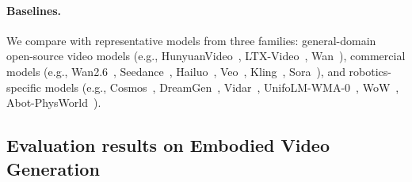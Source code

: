 \documentclass{llmxive}
\begin{document}
\paragraph{Baselines.} We compare with representative models from three families:
general-domain open-source video models (e.g., HunyuanVideo~\cite{wu2025hunyuanvideo}, LTX-Video~\cite{HaCohen2024LTXVideo}, Wan~\cite{wan2025wan}), commercial
models (e.g., Wan2.6~\cite{wan2025wan}, Seedance~\cite{chen2025seedance}, Hailuo~\cite{hailuo2024}, Veo~\cite{GoogleDeepMind2025Veo3}, Kling~\cite{kling2025}, Sora~\cite{openai2025sora2}), and robotics-specific models (e.g., Cosmos~\cite{nvidia2026worldsimulationvideofoundation},
DreamGen~\cite{jang2025dreamgen}, Vidar~\cite{feng2025vidar}, UnifoLM-WMA-0~\cite{unifolm-wma-0}, WoW~\cite{chi2025wow}, Abot-PhysWorld~\cite{ali2025abot}).

\subsection{Evaluation results on Embodied Video Generation}
\end{document}
